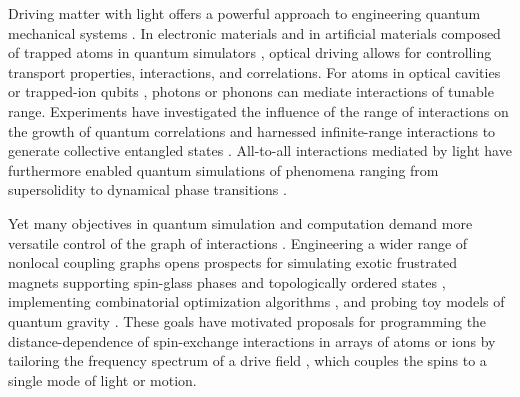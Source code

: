 \documentclass[aps,pra,twocolumn,superscriptaddress]{revtex4-1} %
\begin{document}
\begin{bibunit}
\begin{abstract}
\end{abstract}
\date{\today}


\maketitle

Driving matter with light offers a powerful approach to engineering quantum mechanical systems \cite{rudner2020band,kennedy2015observation,aidelsburger2015measuring,struck2013engineering,vaidya2018tunable,islam2013emergence,jurcevic2014quasiparticle,fausti2011light,wang2013observation,leroux2010implementation,barontini2015deterministic,bohnet2016quantum,hosten2016measurement,welte2018photon,pedrozo2020entanglement,davis2019photon,davis2020protecting,muniz2020exploring,leonard2017supersolid}.  In electronic materials \cite{fausti2011light,wang2013observation} and in artificial materials composed of trapped atoms in quantum simulators \cite{rudner2020band,kennedy2015observation,aidelsburger2015measuring,struck2013engineering,vaidya2018tunable}, optical driving allows for controlling transport properties, interactions, and correlations.  For atoms in optical cavities \cite{vaidya2018tunable} or trapped-ion qubits \cite{islam2013emergence,jurcevic2014quasiparticle}, photons or phonons can mediate interactions of tunable range.  Experiments have investigated the influence of the range of interactions on the growth of quantum correlations \cite{islam2013emergence,jurcevic2014quasiparticle} and harnessed infinite-range interactions to generate collective entangled states \cite{leroux2010implementation,barontini2015deterministic,bohnet2016quantum,hosten2016measurement,welte2018photon,pedrozo2020entanglement}.  All-to-all interactions mediated by light have furthermore enabled quantum simulations of phenomena ranging from supersolidity \cite{leonard2017supersolid} to dynamical phase transitions \cite{muniz2020exploring}.

Yet many objectives in quantum simulation and computation demand more versatile control of the graph of interactions \cite{gopalakrishnan2011frustration,strack2011dicke,hung2016quantum,bentsen2019treelike,belyansky2020minimal,ozeri2020quantum}.  Engineering a wider range of nonlocal coupling graphs opens prospects for simulating exotic frustrated magnets supporting spin-glass phases \cite{strack2011dicke,gopalakrishnan2011frustration} and topologically ordered states \cite{hung2016quantum}, implementing combinatorial optimization algorithms \cite{mcmahon2016fully,berloff2017realizing,marsh2021enhancing,anikeeva2020number}, and probing toy models of quantum gravity \cite{bentsen2019treelike,belyansky2020minimal,kollar2019hyperbolic}.  These goals have motivated proposals for programming the distance-dependence of spin-exchange interactions in arrays of atoms or ions by tailoring the frequency spectrum of a drive field \cite{hung2016quantum,bentsen2019treelike,ozeri2020quantum}, which couples the spins to a single mode of light or motion.  



\end{bibunit}
\end{document}
